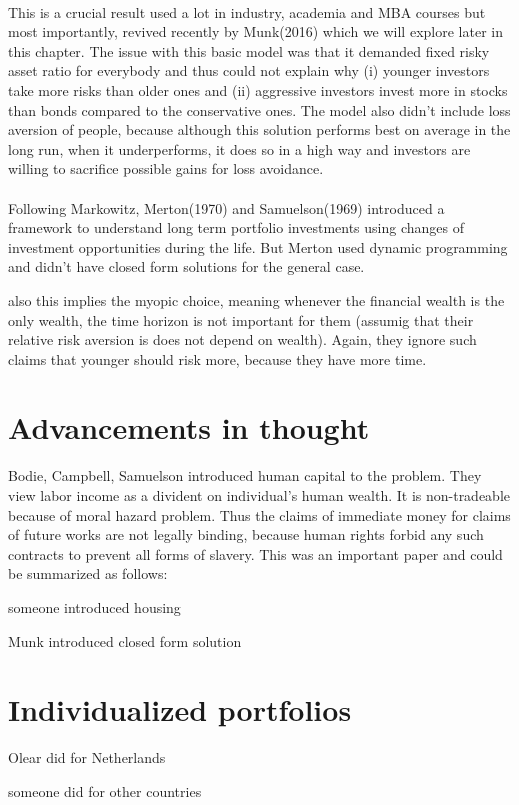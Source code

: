 \paragraph*{}This is a crucial result used a lot in industry, academia and MBA courses but most importantly, revived recently by Munk(2016) which we will explore later in this chapter. The issue with this basic model was that it demanded fixed risky asset ratio for everybody and thus could not explain why (i) younger investors take more risks than older ones and (ii) aggressive investors invest more in stocks than bonds compared to the conservative ones. The model also didn't include loss aversion of people, because although this solution performs best on average in the long run, when it underperforms, it does so in a high way and investors are willing to sacrifice possible gains for loss avoidance.

 \paragraph*{}Following Markowitz, Merton(1970) and Samuelson(1969) introduced a framework to understand long term portfolio investments using changes of investment opportunities during the life. But Merton used dynamic programming and didn't have closed form solutions for the general case.

  also this implies the myopic choice, meaning whenever the financial wealth is the only wealth, the time horizon is not important for them (assumig that their relative risk aversion is does not depend on wealth). Again, they ignore such claims that younger should risk more, because they have more time.

   
\section{Advancements in thought}
\item Bodie, Campbell, Samuelson introduced human capital to the problem.
  They view labor income as a divident on individual's human wealth. It is non-tradeable because of moral hazard problem. Thus the claims of immediate money for claims of future works are not legally binding, because human rights forbid any such contracts to prevent all forms of slavery.
  This was an important paper and could be summarized as follows:
  
\item someone introduced housing
\item Munk introduced closed form solution
\section{Individualized portfolios}
\item Olear did for Netherlands
\item someone did for other countries
